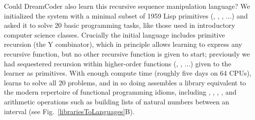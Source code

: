 \documentclass[12pt]{article}
\begin{document}
Could DreamCoder also learn this recursive sequence manipulation language? %
% 
%
%
%
We initialized the system %
with a minimal subset of
1959 Lisp primitives (, , , $\dots$) and asked it to solve 20 basic programming tasks, like those used in introductory computer science classes. %
Crucially the initial language includes
primitive recursion (the Y combinator), which in principle allows learning to express any recursive function, but no other recursive function is given to start;
previously we had sequestered recursion within higher-order functions (, , $\dots$) given to the learner as primitives.
With enough compute time (roughly five days on 64 CPUs), \system learns to solve all 20 problems, %
and in so doing assembles a library equivalent to the modern repertoire of functional programming idioms, including , , ,
, and arithmetic operations such as building
lists of natural numbers between an interval (see Fig.~\ref{librariesToLanguages}B).
\end{document}

